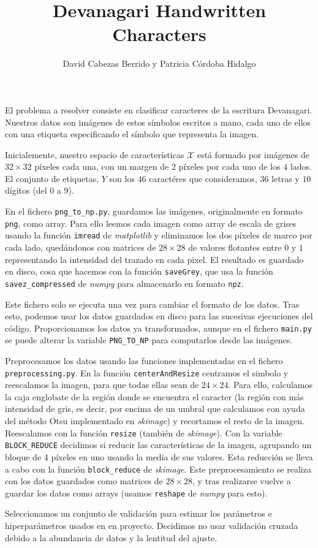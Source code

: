 \documentclass[a4]{article}
\title{Devanagari Handwritten Characters}
\author{David Cabezas Berrido y Patricia Córdoba Hidalgo}
\date{}
\begin{document}
\maketitle
\tableofcontents

El problema a resolver consiste en clasificar caracteres de la
escritura Devanagari. Nuestros datos son imágenes de estos símbolos
escritos a mano, cada uno de ellos con una etiqueta especificando el
símbolo que representa la imagen.

Inicialemente, nuestro espacio de características $\mathcal{X}$ está
formado por imágenes de $32 \times 32$ píxeles cada una, con un margen de $2$ píxeles por cada uno de los $4$ lados. El conjunto de etiquetas, $Y$ son los $46$ caractéres que consideramos, $36$ letras y $10$ dígitos (del $0$ a $9$).

En el fichero \texttt{png\_to\_np.py}, guardamos las imágenes, originalmente en formato \texttt{png}, como array. Para ello leemos cada imagen como array de escala de grises usando la función \texttt{imread} de \textit{matplotlib} y eliminamos los dos píxeles de marco por cada lado, quedándonos con matrices de $28 \times 28$ de valores flotantes entre $0$ y $1$ representando la intensidad del trazado en cada pixel. El resultado es guardado en disco, cosa que hacemos con la función \texttt{saveGrey}, que usa la función \texttt{savez\_compressed} de \textit{numpy} para almacenarlo en formato \texttt{npz}.

Este fichero solo se ejecuta una vez para cambiar el formato de los datos. Tras esto, podemos usar los datos guardados en disco para las sucesivas ejecuciones del código. Proporcionamos los datos ya transformados, aunque en el fichero \texttt{main.py} se puede alterar la variable \texttt{PNG\_TO\_NP} para computarlos desde las imágenes.

Preprocesamos los datos usando las funciones implementadas en el fichero \texttt{preprocessing.py}. En la función \texttt{centerAndResize} centramos el simbolo y reescalamos la imagen, para que todas ellas sean de $24 \times 24$. Para ello, calculamos la caja englobate de la región donde se encuentra el caracter (la región con más intensidad de gris, es decir, por encima de un umbral que calculamos con ayuda del método Otsu implementado en \textit{skimage}) y recortamos el resto de la imagen. Reescalamos con la función \texttt{resize} (también de \textit{skimage}). Con la variable \texttt{BLOCK\_REDUCE} decidimos si reducir las características de la imagen, agrupando un bloque de 4 píxeles en uno usando la media de sus valores. Esta reducción se lleva a cabo con la función \texttt{block\_reduce} de \textit{skimage}. Este preprocesamiento se realiza con los datos guardados como matrices de $28 \times 28$, y tras realizarse vuelve a guardar los datos como arrays (usamos \texttt{reshape} de \textit{numpy} para esto).

Seleccionamos un conjunto de validación para estimar los parámetros e hiperparámetros usados en en proyecto. Decidimos no usar validación cruzada debido a la abundancia de datos y la lentitud del ajuste.
\end{document}
